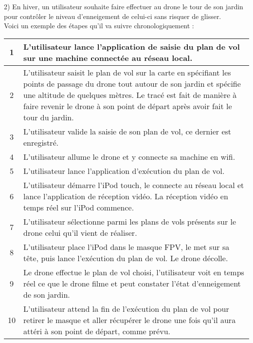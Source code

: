 \documentclass{article}
\begin{document}
        \newpage
         \begin{flushleft}
        2) En hiver, un utilisateur souhaite faire effectuer au drone le tour de son jardin pour contrôler le niveau d'enneigement de celui-ci sans risquer de glisser.\\
        Voici un exemple des étapes qu'il va suivre chronologiquement : \\
         \end{flushleft}
	    \begin{center}
	    \renewcommand{\arraystretch}{2}
        \begin{tabularx}{15cm}{|c|X|}
            \hline
            1 & L'utilisateur lance l'application de saisie du plan de vol sur une machine connectée au réseau local.\\
            \hline
            2 & L'utilisateur saisit le plan de vol sur la carte en spécifiant les points de passage du drone tout autour de son jardin et spécifie une altitude de quelques mètres. Le tracé est fait de manière à faire revenir le drone à son point de départ après avoir fait le tour du jardin. \\
            \hline
            3 & L'utilisateur valide la saisie de son plan de vol, ce dernier est enregistré. \\
            \hline
            4 & L'utilisateur allume le drone et y connecte sa machine en wifi. \\
            \hline
            5 & L'utilisateur lance l'application d'exécution du plan de vol. \\
            \hline
            6 &  L'utilisateur démarre l'iPod touch, le connecte au réseau local et lance l'application de réception vidéo. La réception vidéo en temps réel sur l'iPod commence.\\
            \hline
            7 & L'utilisateur sélectionne parmi les plans de vols présents sur le drone celui qu'il vient de réaliser. \\
            \hline
            8 & L'utilisateur place l'iPod dans le masque FPV, le met sur sa tête, puis lance l'exécution du plan de vol. Le drone décolle. \\
            \hline
            9 & Le drone effectue le plan de vol choisi, l'utilisateur voit en temps réel ce que le drone filme et peut constater l'état d'enneigement de son jardin. \\
            \hline
            10 & L'utilisateur attend la fin de l'exécution du plan de vol pour retirer le masque et aller récupérer le drone une fois qu'il aura attéri à son point de départ, comme prévu.\\
            \hline
        \end{tabularx}
        \end{center}
        
\end{document}
